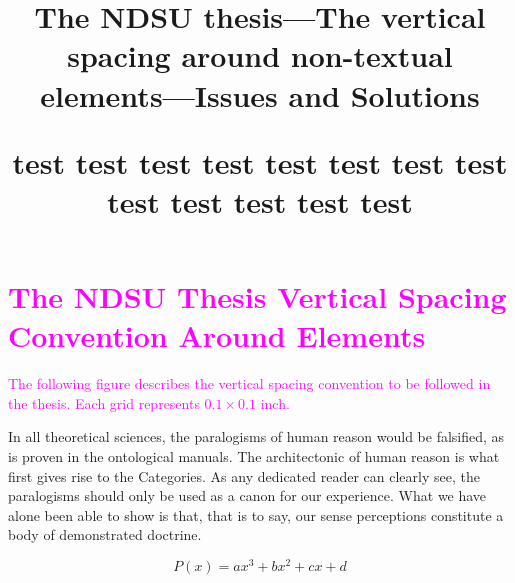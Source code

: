 \documentclass[12pt,mathdesign,showframe,showgrid]{ndsu-thesis-2022}
\title{The NDSU thesis---The vertical spacing around non-textual elements---Issues and Solutions \par test test test test test test test test test test test test test}
\begin{document}


\section{\textcolor{magenta}{The NDSU Thesis Vertical Spacing Convention Around Elements}}

\textcolor{magenta}{The following figure describes the vertical spacing convention to be followed in the thesis. Each grid represents $0.1 \times 0.1$ inch.} 




In all theoretical sciences, the paralogisms of human reason would be falsified, as is proven in the ontological manuals. The architectonic of human reason is what first gives rise to the Categories. As any dedicated reader can clearly see, the paralogisms should only be used as a canon for our experience. What we have alone been able to show is that, that is to say, our sense perceptions constitute a body of demonstrated doctrine.

\newpage

\kant[1-2]


\begin{equation}
P(x) = ax^3+bx^2+cx+d
\end{equation}



\kant[9]

\end{document}
